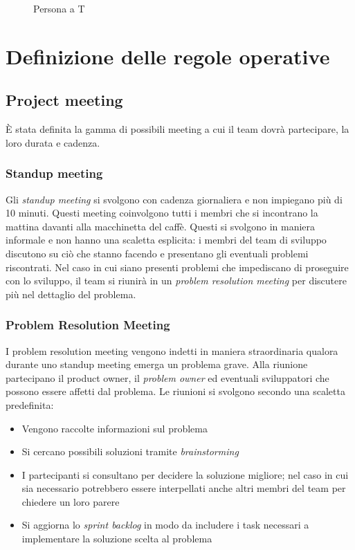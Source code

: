 \begin{figure}[htp]
  \centering
  \caption{Persona a T}
  \label{fig:croce}
\end{figure}

\section{Definizione delle regole operative}
\subsection{Project meeting}
È stata definita la gamma di possibili meeting a cui il team dovrà partecipare, la loro durata e cadenza.

\subsubsection{Standup meeting}
Gli \emph{standup meeting} si svolgono con cadenza giornaliera e non impiegano più di 10 minuti. Questi meeting coinvolgono tutti i membri che si incontrano la mattina davanti alla macchinetta del caffè.
Questi si svolgono in maniera informale e non hanno una scaletta esplicita: i membri del team di sviluppo discutono su ciò che stanno facendo e presentano gli eventuali problemi riscontrati.
Nel caso in cui siano presenti problemi che impediscano di proseguire con lo sviluppo, il team si riunirà in un \emph{problem resolution meeting} per discutere più nel dettaglio del problema.

\subsubsection{Problem Resolution Meeting}
I problem resolution meeting vengono indetti in maniera straordinaria qualora durante uno standup meeting emerga un problema grave. Alla riunione partecipano il product owner, il \emph{problem owner} ed eventuali sviluppatori che possono essere affetti dal problema. Le riunioni si svolgono secondo una scaletta predefinita:
\begin{itemize}
  \item Vengono raccolte informazioni sul problema
  \item Si cercano possibili soluzioni tramite \emph{brainstorming}
  \item I partecipanti si consultano per decidere la soluzione migliore; nel caso in cui sia necessario potrebbero essere interpellati anche altri membri del team per chiedere un loro parere
  \item Si aggiorna lo \emph{sprint backlog} in modo da includere i task necessari a implementare la soluzione scelta al problema
\end{itemize}

